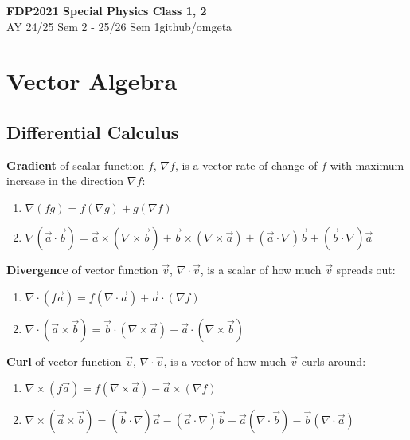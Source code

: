 \documentclass[12pt, a4paper]{article}
\newcommand{\mytitle}{FDP2021 Special Physics Class 1, 2}
\newcommand{\myauthor}{github/omgeta}
\newcommand{\mydate}{AY 24/25 Sem 2 - 25/26 Sem 1}
\begin{document}
\raggedright
\footnotesize
\begin{multicols*}{3}
\setlength{\premulticols}{1pt}
\setlength{\postmulticols}{1pt}
\setlength{\multicolsep}{1pt}
\setlength{\columnsep}{2pt}

{\normalsize{\textbf{\mytitle}}} \\
{\footnotesize{\mydate\hspace{2pt}\textemdash\hspace{2pt}\myauthor}}
\vspace{-0.8em}
\section{Vector Algebra}
\subsection{Differential Calculus}
\textbf{Gradient} of scalar function $f$, $\nabla f$, is a vector rate of change of $f$ with maximum increase in the direction $\nabla f$:
\begin{enumerate}[\roman*.]
  \item $\nabla(fg) = f(\nabla g) + g(\nabla f)$
  \item $\nabla (\vec{a} \cdot \vec{b}) = \vec{a} \times (\nabla \times \vec{b}) + \vec{b} \times (\nabla \times \vec{a}) + (\vec{a}\cdot\nabla)\vec{b} + (\vec{b}\cdot \nabla)\vec{a}$
\end{enumerate}

\textbf{Divergence} of vector function $\vec{v}$, $\nabla \cdot \vec{v}$, is a scalar of how much $\vec{v}$ spreads out:
\begin{enumerate}[\roman*.]
  \item $\nabla \cdot (f \vec{a}) = f(\nabla \cdot \vec{a}) + \vec{a}\cdot(\nabla f)$
  \item $\nabla \cdot (\vec{a} \times \vec{b}) = \vec{b}\cdot(\nabla\times \vec{a}) - \vec{a}\cdot(\nabla\times \vec{b})$
\end{enumerate}

\textbf{Curl} of vector function $\vec{v}$, $\nabla \cdot \vec{v}$, is a vector of how much $\vec{v}$ curls around:
\begin{enumerate}[\roman*.]
  \item $\nabla \times (f \vec{a}) = f(\nabla \times \vec{a}) - \vec{a} \times (\nabla f)$
  \item $\nabla \times (\vec{a}\times \vec{b}) = (\vec{b}\cdot\nabla)\vec{a} - (\vec{a}\cdot\nabla)\vec{b} + \vec{a}(\nabla\cdot \vec{b})- \vec{b}(\nabla\cdot \vec{a})$
\end{enumerate}


\end{multicols*}
\end{document}
